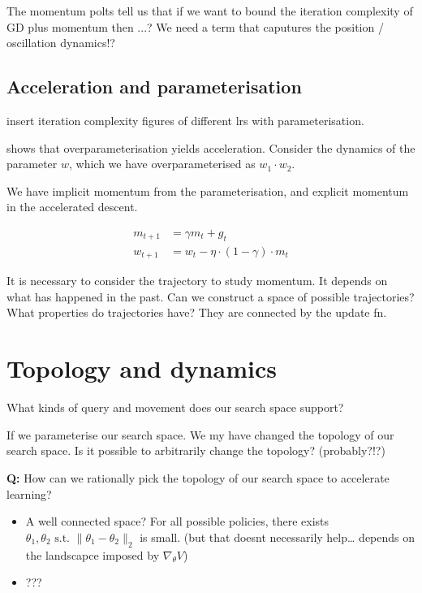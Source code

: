 
The momentum polts tell us that if we want to bound the iteration complexity of GD plus momentum
then ...? We need a term that caputures the position / oscillation dynamics!?


\subsection{Acceleration and parameterisation}

{\color{red}insert iteration complexity figures of different lrs with parameterisation.}

\cite{Arora2018} shows that overparameterisation yields acceleration. Consider
the dynamics of the parameter $w$, which we have overparameterised as $w_1 \cdot w_2$.



We have implicit momentum from the parameterisation, and explicit momentum in the accelerated descent.


\begin{align}
m_{t+1} &= \gamma m_t + g_t \\
w_{t+1} &= w_t - \eta \cdot (1-\gamma) \cdot m_t
\end{align}

It is necessary to consider the trajectory to study momentum. It depends
on what has happened in the past. Can we construct a space of possible
trajectories? What properties do trajectories have? They are connected
by the update fn.

\section{Topology and dynamics}

What kinds of query and movement does our search space support?

If we parameterise our search space. We my have changed the topology of our search space.
Is it possible to arbitrarily change the topology? (probably?!?)

\textbf{Q:} How can we rationally pick the topology of our search space
to accelerate learning?

\begin{itemize}
\item
  A well connected space? For all possible policies, there exists
  \(\theta_1, \theta_2 \text{ s.t. } \parallel \theta_1- \theta_2\parallel_2\)
  is small. (but that doesnt necessarily help\ldots{} depends on the
  landscapce imposed by \(\nabla_{\theta} V\))
\item
  ???
\end{itemize}

